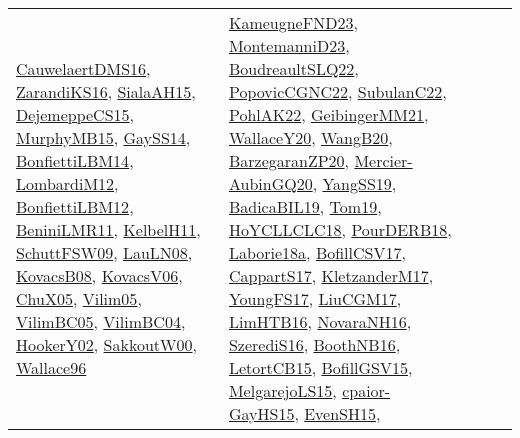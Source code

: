 {\begin{longtable}{lp{3cm}>{\raggedright}p{6cm}>{\raggedright}p{6cm}p{8cm}}
\href{papers/CauwelaertDMS16.pdf}{CauwelaertDMS16}\cite{CauwelaertDMS16}, \href{articles/ZarandiKS16.pdf}{ZarandiKS16}\cite{ZarandiKS16}, \href{papers/SialaAH15.pdf}{SialaAH15}\cite{SialaAH15}, \href{papers/DejemeppeCS15.pdf}{DejemeppeCS15}\cite{DejemeppeCS15}, \href{papers/MurphyMB15.pdf}{MurphyMB15}\cite{MurphyMB15}, \href{papers/GaySS14.pdf}{GaySS14}\cite{GaySS14}, \href{articles/BonfiettiLBM14.pdf}{BonfiettiLBM14}\cite{BonfiettiLBM14}, \href{articles/LombardiM12.pdf}{LombardiM12}\cite{LombardiM12}, \href{papers/BonfiettiLBM12.pdf}{BonfiettiLBM12}\cite{BonfiettiLBM12}, \href{articles/BeniniLMR11.pdf}{BeniniLMR11}\cite{BeniniLMR11}, \href{articles/KelbelH11.pdf}{KelbelH11}\cite{KelbelH11}, \href{papers/SchuttFSW09.pdf}{SchuttFSW09}\cite{SchuttFSW09}, \href{papers/LauLN08.pdf}{LauLN08}\cite{LauLN08}, \href{articles/KovacsB08.pdf}{KovacsB08}\cite{KovacsB08}, \href{papers/KovacsV06.pdf}{KovacsV06}\cite{KovacsV06}, \href{papers/ChuX05.pdf}{ChuX05}\cite{ChuX05}, \href{papers/Vilim05.pdf}{Vilim05}\cite{Vilim05}, \href{articles/VilimBC05.pdf}{VilimBC05}\cite{VilimBC05}, \href{papers/VilimBC04.pdf}{VilimBC04}\cite{VilimBC04}, \href{papers/HookerY02.pdf}{HookerY02}\cite{HookerY02}, \href{articles/SakkoutW00.pdf}{SakkoutW00}\cite{SakkoutW00}, \href{articles/Wallace96.pdf}{Wallace96}\cite{Wallace96} & \href{papers/KameugneFND23.pdf}{KameugneFND23}\cite{KameugneFND23}, \href{articles/MontemanniD23.pdf}{MontemanniD23}\cite{MontemanniD23}, \href{papers/BoudreaultSLQ22.pdf}{BoudreaultSLQ22}\cite{BoudreaultSLQ22}, \href{papers/PopovicCGNC22.pdf}{PopovicCGNC22}\cite{PopovicCGNC22}, \href{articles/SubulanC22.pdf}{SubulanC22}\cite{SubulanC22}, \href{articles/PohlAK22.pdf}{PohlAK22}\cite{PohlAK22}, \href{papers/GeibingerMM21.pdf}{GeibingerMM21}\cite{GeibingerMM21}, \href{articles/WallaceY20.pdf}{WallaceY20}\cite{WallaceY20}, \href{papers/WangB20.pdf}{WangB20}\cite{WangB20}, \href{papers/BarzegaranZP20.pdf}{BarzegaranZP20}\cite{BarzegaranZP20}, \href{papers/Mercier-AubinGQ20.pdf}{Mercier-AubinGQ20}\cite{Mercier-AubinGQ20}, \href{papers/YangSS19.pdf}{YangSS19}\cite{YangSS19}, \href{papers/BadicaBIL19.pdf}{BadicaBIL19}\cite{BadicaBIL19}, \href{papers/Tom19.pdf}{Tom19}\cite{Tom19}, \href{papers/HoYCLLCLC18.pdf}{HoYCLLCLC18}\cite{HoYCLLCLC18}, \href{articles/PourDERB18.pdf}{PourDERB18}\cite{PourDERB18}, \href{papers/Laborie18a.pdf}{Laborie18a}\cite{Laborie18a}, \href{papers/BofillCSV17.pdf}{BofillCSV17}\cite{BofillCSV17}, \href{papers/CappartS17.pdf}{CappartS17}\cite{CappartS17}, \href{papers/KletzanderM17.pdf}{KletzanderM17}\cite{KletzanderM17}, \href{papers/YoungFS17.pdf}{YoungFS17}\cite{YoungFS17}, \href{papers/LiuCGM17.pdf}{LiuCGM17}\cite{LiuCGM17}, \href{papers/LimHTB16.pdf}{LimHTB16}\cite{LimHTB16}, \href{articles/NovaraNH16.pdf}{NovaraNH16}\cite{NovaraNH16}, \href{papers/SzerediS16.pdf}{SzerediS16}\cite{SzerediS16}, \href{papers/BoothNB16.pdf}{BoothNB16}\cite{BoothNB16}, \href{articles/LetortCB15.pdf}{LetortCB15}\cite{LetortCB15}, \href{papers/BofillGSV15.pdf}{BofillGSV15}\cite{BofillGSV15}, \href{papers/MelgarejoLS15.pdf}{MelgarejoLS15}\cite{MelgarejoLS15}, \href{papers/cpaior-GayHS15.pdf}{cpaior-GayHS15}\cite{cpaior-GayHS15}, \href{papers/EvenSH15.pdf}{EvenSH15}\cite{EvenSH15}, 
\end{longtable}}
